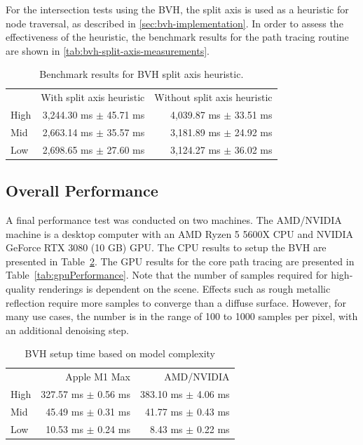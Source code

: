For the intersection tests using the \gls{BVH}, the split axis is used as a heuristic for node traversal, as described in \autoref{sec:bvh-implementation}. In order to assess the effectiveness of the heuristic, the benchmark results for the path tracing routine are shown in \autoref{tab:bvh-split-axis-measurements}.

\begin{table}[H]
    \centering
    \begin{tabular}{@{}lrr@{}}
        \toprule
             & With split axis heuristic  & Without split axis heuristic \\
        High & 3,244.30 ms $\pm$ 45.71 ms & 4,039.87 ms $\pm$ 33.51 ms   \\
        Mid  & 2,663.14 ms $\pm$ 35.57 ms & 3,181.89 ms $\pm$ 24.92 ms   \\
        Low  & 2,698.65 ms $\pm$ 27.60 ms & 3,124.27 ms $\pm$ 36.02 ms   \\
        \bottomrule
    \end{tabular}
    \caption{Benchmark results for \gls{BVH} split axis heuristic.}
    \label{tab:bvh-split-axis-measurements}
\end{table}

\newpage
\subsection*{Overall Performance}

A final performance test was conducted on two machines. The AMD/NVIDIA machine is a desktop computer with an AMD Ryzen 5 5600X \gls{CPU} and NVIDIA GeForce RTX 3080 (10 GB) \gls{GPU}. The \gls{CPU} results to setup the \gls{BVH} are presented in Table~\ref{tab:cpuPerformance}. The \gls{GPU} results for the core path tracing are presented in Table~\ref{tab:gpuPerformance}. Note that the number of samples required for high-quality renderings is dependent on the scene. Effects such as rough metallic reflection require more samples to converge than a diffuse surface. However, for many use cases, the number is in the range of 100 to 1000 samples per pixel, with an additional denoising step.

\begin{table}[H]
    \centering
    \begin{tabular}{lrr}
        \toprule
             & Apple M1 Max            & AMD/NVIDIA              \\
        High & 327.57 ms $\pm$ 0.56 ms & 383.10 ms $\pm$ 4.06 ms \\
        Mid  & 45.49 ms $\pm$ 0.31 ms  & 41.77 ms $\pm$ 0.43 ms  \\
        Low  & 10.53 ms $\pm$ 0.24 ms  & 8.43 ms $\pm$ 0.22 ms   \\
        \bottomrule
    \end{tabular}
    \caption{\gls{BVH} setup time based on model complexity}
    \label{tab:cpuPerformance}
\end{table}

